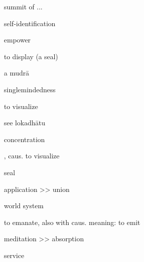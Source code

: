 summit of ...

	self-identification

empower

to display (a seal)

	a mudrā

singlemindedness

to visualize

	see lokadhātu

	concentration

, caus.
to visualize

seal

application
	>> union

world system

to emanate,
	also with caus. meaning: to emit

meditation
	>> absorption

service